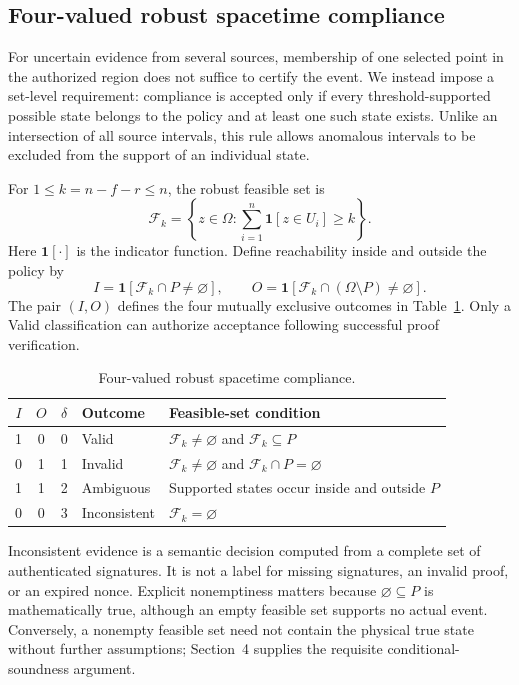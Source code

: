\subsection{Four-valued robust spacetime compliance}
For uncertain evidence from several sources, membership of one selected point in the authorized region does not suffice to certify the event. We instead impose a set-level requirement: compliance is accepted only if every threshold-supported possible state belongs to the policy and at least one such state exists. Unlike an intersection of all source intervals, this rule allows anomalous intervals to be excluded from the support of an individual state.

For $1\leq k=n-f-r\leq n$, the robust feasible set is
\begin{equation}\label{eq:feasible}
\mathcal F_k=\left\{z\in\Omega:\sum_{i=1}^n\mathbf 1[z\in U_i]\geq k\right\}.
\end{equation}
Here $\mathbf 1[\cdot]$ is the indicator function. Define reachability inside and outside the policy by
\[
I=\mathbf 1[\mathcal F_k\cap P\ne\varnothing],\qquad
O=\mathbf 1[\mathcal F_k\cap(\Omega\setminus P)\ne\varnothing].
\]
The pair $(I,O)$ defines the four mutually exclusive outcomes in Table~\ref{tab:decisions}. Only a Valid classification can authorize acceptance following successful proof verification.

\begin{table}[htbp]\centering\small
\caption{Four-valued robust spacetime compliance.}\label{tab:decisions}
\begin{tabularx}{\linewidth}{@{}ccclX@{}}\toprule
$I$ & $O$ & $\delta$ & Outcome & Feasible-set condition\\\midrule
1&0&0&Valid&$\mathcal F_k\ne\varnothing$ and $\mathcal F_k\subseteq P$\\
0&1&1&Invalid&$\mathcal F_k\ne\varnothing$ and $\mathcal F_k\cap P=\varnothing$\\
1&1&2&Ambiguous&Supported states occur inside and outside $P$\\
0&0&3&Inconsistent&$\mathcal F_k=\varnothing$\\\bottomrule
\end{tabularx}
\end{table}

Inconsistent evidence is a semantic decision computed from a complete set of authenticated signatures. It is not a label for missing signatures, an invalid proof, or an expired nonce. Explicit nonemptiness matters because $\varnothing\subseteq P$ is mathematically true, although an empty feasible set supports no actual event. Conversely, a nonempty feasible set need not contain the physical true state without further assumptions; Section~4 supplies the requisite conditional-soundness argument.

